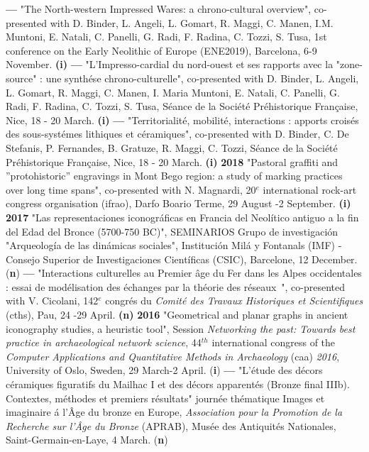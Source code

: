 \documentclass[11pt]{report} %
\begin{document}
\smallbreak
\textbf{---  }"The North-western Impressed Wares: a chrono-cultural overview", co-presented with D. Binder, L. Angeli, L. Gomart, R. Maggi, C. Manen, I.M. Muntoni, E. Natali, C. Panelli, G. Radi, F. Radina, C. Tozzi, S. Tusa, 1st conference on the Early Neolithic of Europe (ENE2019), Barcelona, 6-9 November. \textbf{(i)}
\smallbreak
\textbf{---  }"L'Impresso-cardial du nord-ouest et ses rapports avec la "zone-source" : une synth\'{e}se chrono-culturelle", co-presented with D. Binder, L. Angeli, L. Gomart, R. Maggi, C. Manen, I. Maria Muntoni, E. Natali, C. Panelli, G. Radi, F. Radina, C. Tozzi, S. Tusa, S\'{e}ance de la Soci\'{e}t\'{e} Pr\'{e}historique Fran\c{c}aise, Nice, 18 - 20 March.\textbf{ (i)}
\smallbreak
\textbf{---  }"Territorialit\'{e}, mobilit\'{e}, interactions : apports crois\'{e}s des sous-syst\'{e}mes lithiques et c\'{e}ramiques", co-presented with D. Binder, C. De Stefanis, P. Fernandes, B. Gratuze, R. Maggi, C. Tozzi, S\'{e}ance de la Soci\'{e}t\'{e} Pr\'{e}historique Fran\c{c}aise, Nice, 18 - 20 March.\textbf{ (i)}
\smallbreak
\textbf{2018 }"Pastoral graffiti and ''protohistoric'' engravings in Mont Bego region: a study of marking practices over long time spans", co-presented with N. Magnardi, 20${}^{e}$ international rock-art congress organisation (ifrao), Darfo Boario Terme, 29 August -2 September.\textbf{ (i)}
\smallbreak
\textbf{2017 }"Las representaciones iconogr\'{a}ficas en Francia del Neol\'{i}tico antiguo a la fin del Edad del Bronce (5700-750 BC)", SEMINARIOS Grupo de investigaci\'{o}n "Arqueolog\'{i}a de las din\'{a}micas sociales", Instituci\'{o}n Mil\'{a} y Fontanals (IMF) - Consejo Superior de Investigaciones Cient\'{i}ficas (CSIC), Barcelone, 12 December. (\textbf{n})
\smallbreak
\textbf{---  } "Interactions culturelles au Premier \^{a}ge du Fer dans les Alpes occidentales : essai de mod\'{e}lisation des \'{e}changes par la th\'{e}orie des r\'{e}seaux~", co-presented with V. Cicolani, 142${}^{e}$ congr\'{e}s du \textit{Comit\'{e} des Travaux Historiques et Scientifiques} (cths), Pau, 24 -29 April.\textbf{ (n)}
\smallbreak
\textbf{2016 }"Geometrical and planar graphs in ancient iconography studies, a heuristic tool", Session \textit{Networking the past: Towards best practice in archaeological network science}, 44${}^{th}$ international congress of the \textit{Computer Applications and Quantitative Methods in Archaeology }(caa) \textit{2016}, University of Oslo, Sweden, 29 March-2 April. (\textbf{i})\textbf{}
\smallbreak
\textbf{---  }"L'\'{e}tude des d\'{e}cors c\'{e}ramiques figuratifs du Mailhac I et des d\'{e}cors apparent\'{e}s (Bronze final IIIb). Contextes, m\'{e}thodes et premiers r\'{e}sultats" journ\'{e}e th\'{e}matique Images et imaginaire \'{a} l'\^{A}ge du bronze en Europe, \textit{Association pour la Promotion de la Recherche sur l'\^{A}ge du Bronze} (APRAB), Mus\'{e}e des Antiquit\'{e}s Nationales, Saint-Germain-en-Laye, 4 March. (\textbf{n})
\end{document}
